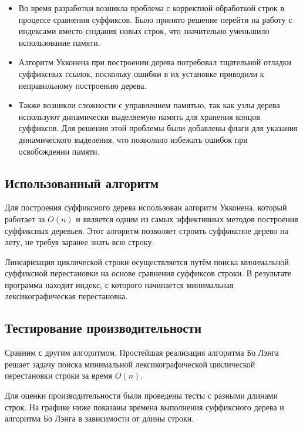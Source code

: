 \documentclass[12pt]{article}
\begin{document}
\begin{itemize}
    \item Во время разработки возникла проблема с корректной обработкой строк в процессе сравнения суффиксов. Было принято решение перейти на работу с индексами вместо создания новых строк, что значительно уменьшило использование памяти.
    \item Алгоритм Укконена при построении дерева потребовал тщательной отладки суффиксных ссылок, поскольку ошибки в их установке приводили к неправильному построению дерева.
    \item Также возникли сложности с управлением памятью, так как узлы дерева используют динамически выделяемую память для хранения концов суффиксов. Для решения этой проблемы были добавлены флаги для указания динамического выделения, что позволило избежать ошибок при освобождении памяти.
\end{itemize}

\subsection*{Использованный алгоритм}

Для построения суффиксного дерева использован алгоритм Укконена, который работает за $O(n)$ и является одним из самых эффективных методов построения суффиксных деревьев. Этот алгоритм позволяет строить суффиксное дерево на лету, не требуя заранее знать всю строку.

Линеаризация циклической строки осуществляется путём поиска минимальной суффиксной перестановки на основе сравнения суффиксов строки. В результате программа находит индекс, с которого начинается минимальная лексикографическая перестановка.


\subsection*{Тестирование производительности}
Сравним с другим алгоритмом. Простейшая реализация алгоритма Бо Лэнга решает задачу поиска минимальной лексикографической циклической перестановки строки за время $O(n)$.

Для оценки производительности были проведены тесты с разными длинами строк. На графике ниже показаны времена выполнения суффиксного дерева и алгоритма Бо Лэнга в зависимости от длины строки.
\end{document}

